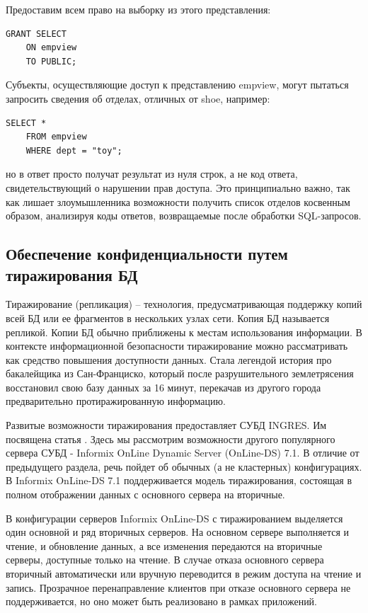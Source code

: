 Предоставим всем право на выборку из этого представления:
\begin{lstlisting}[]
    GRANT SELECT
    ON empview
    TO PUBLIC;
\end{lstlisting}

Субъекты, осуществляющие доступ к представлению empview, могут пытаться запросить сведения об
отделах, отличных от shoe, например:
\begin{lstlisting}[]
    SELECT *
    FROM empview
    WHERE dept = "toy";
\end{lstlisting}

но в ответ просто получат результат из нуля строк, а не код ответа, свидетельствующий о нарушении
прав доступа. Это принципиально важно, так как лишает злоумышленника возможности получить список
отделов косвенным образом, анализируя коды ответов, возвращаемые после обработки SQL-запросов.


\subsection{Обеспечение конфиденциальности путем тиражирования БД}

Тиражирование (репликация) – технология, предусматривающая поддержку
копий всей БД или ее фрагментов в нескольких узлах сети. Копия БД называется
репликой. Копии БД обычно приближены к местам использования информации.
В контексте информационной безопасности тиражирование можно рассматривать как средство повышения
доступности данных. Стала легендой история про бакалейщика из Сан-Франциско, который после
разрушительного землетрясения восстановил свою базу данных за 16 минут, перекачав из другого
города предварительно протиражированную информацию.

Развитые возможности тиражирования предоставляет СУБД INGRES.
Им посвящена статья \cite{BeynonDavies}. Здесь мы рассмотрим возможности другого популярного сервера
СУБД - Informix OnLine Dynamic Server (OnLine-DS) 7.1. В отличие от предыдущего раздела, речь
пойдет об обычных (а не кластерных) конфигурациях.
В Informix OnLine-DS 7.1 поддерживается модель тиражирования, состоящая в полном отображении данных
с основного сервера на вторичные.

В конфигурации серверов Informix OnLine-DS с тиражированием выделяется один основной и ряд
вторичных серверов. На основном сервере выполняется и чтение, и обновление данных, а все изменения
передаются на вторичные серверы, доступные только на чтение. В случае отказа основного сервера
вторичный автоматически или вручную переводится в режим доступа на чтение и запись. Прозрачное
перенаправление клиентов при отказе основного сервера не поддерживается, но оно может быть
реализовано в рамках приложений.

